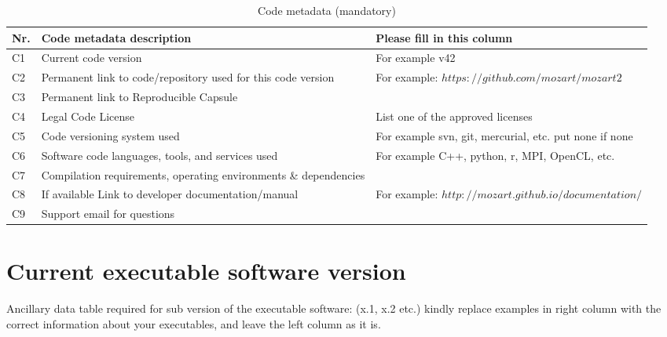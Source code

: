 \documentclass[preprint,12pt,letterpaper]{elsarticle}
\begin{document}
\begin{table}[!h]
\begin{tabular}{|l|p{6.5cm}|p{6.5cm}|}
\hline
\textbf{Nr.} & \textbf{Code metadata description} & \textbf{Please fill in this column} \\
\hline
C1 & Current code version & For example v42 \\
\hline
C2 & Permanent link to code/repository used for this code version & For example: $https://github.com/mozart/mozart2$ \\
\hline
C3  & Permanent link to Reproducible Capsule & \\
\hline
C4 & Legal Code License   & List one of the approved licenses \\
\hline
C5 & Code versioning system used & For example svn, git, mercurial, etc. put none if none \\
\hline
C6 & Software code languages, tools, and services used & For example C++, python, r, MPI, OpenCL, etc. \\
\hline
C7 & Compilation requirements, operating environments \& dependencies & \\
\hline
C8 & If available Link to developer documentation/manual & For example: $http://mozart.github.io/documentation/$ \\
\hline
C9 & Support email for questions & \\
\hline
\end{tabular}
\caption{Code metadata (mandatory)}
\end{table}

\section*{Current executable software version}

Ancillary data table required for sub version of the executable software: (x.1, x.2 etc.) kindly replace examples in right column with the correct information about your executables, and leave the left column as it is.
\end{document}
